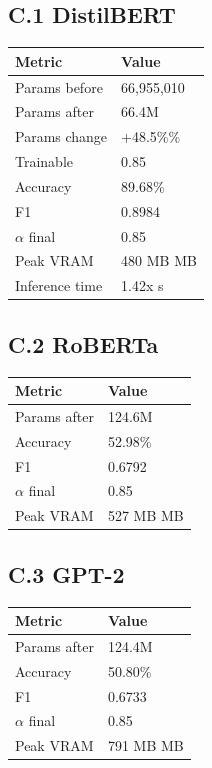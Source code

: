 \subsection{C.1 DistilBERT}

\begin{table}[H]
\centering
\small
\begin{tabular}{ll}
\toprule
\textbf{Metric} & \textbf{Value} \\
\midrule
Params before & 66,955,010 \\
Params after & 66.4M \\
Params change & +48.5\%\% \\
Trainable & 0.85 \\
Accuracy & 89.68\% \\
F1 & 0.8984 \\
$\alpha$ final & 0.85 \\
Peak VRAM & 480 MB MB \\
Inference time & 1.42x s \\
\bottomrule
\end{tabular}
\end{table}

\subsection{C.2 RoBERTa}

\begin{table}[H]
\centering
\small
\begin{tabular}{ll}
\toprule
\textbf{Metric} & \textbf{Value} \\
\midrule
Params after & 124.6M \\
Accuracy & 52.98\% \\
F1 & 0.6792 \\
$\alpha$ final & 0.85 \\
Peak VRAM & 527 MB MB \\
\bottomrule
\end{tabular}
\end{table}

\subsection{C.3 GPT-2}

\begin{table}[H]
\centering
\small
\begin{tabular}{ll}
\toprule
\textbf{Metric} & \textbf{Value} \\
\midrule
Params after & 124.4M \\
Accuracy & 50.80\% \\
F1 & 0.6733 \\
$\alpha$ final & 0.85 \\
Peak VRAM & 791 MB MB \\
\bottomrule
\end{tabular}
\end{table}

